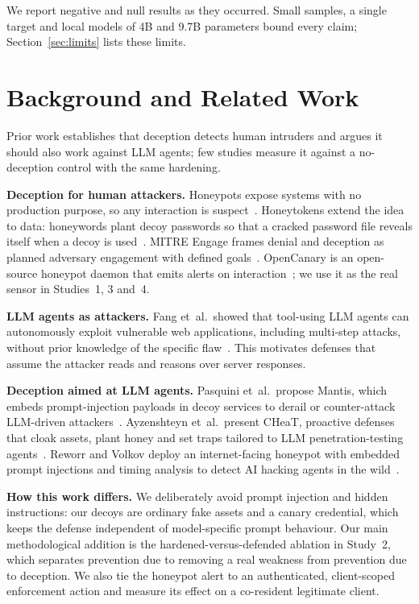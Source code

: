 \documentclass[conference]{IEEEtran}
\begin{document}
We report negative and null results as they occurred. Small samples, a single target and local models of 4B and 9.7B parameters bound every claim; Section~\ref{sec:limits} lists these limits.

\section{Background and Related Work}
Prior work establishes that deception detects human intruders and argues it should also work against LLM agents; few studies measure it against a no-deception control with the same hardening.

\textbf{Deception for human attackers.} Honeypots expose systems with no production purpose, so any interaction is suspect~\cite{spitzner2002,stoll1989}. Honeytokens extend the idea to data: honeywords plant decoy passwords so that a cracked password file reveals itself when a decoy is used~\cite{juels2013honeywords}. MITRE Engage frames denial and deception as planned adversary engagement with defined goals~\cite{mitre-engage}. OpenCanary is an open-source honeypot daemon that emits alerts on interaction~\cite{opencanary}; we use it as the real sensor in Studies~1, 3 and~4.

\textbf{LLM agents as attackers.} Fang et~al.\ showed that tool-using LLM agents can autonomously exploit vulnerable web applications, including multi-step attacks, without prior knowledge of the specific flaw~\cite{fang2024hack}. This motivates defenses that assume the attacker reads and reasons over server responses.

\textbf{Deception aimed at LLM agents.} Pasquini et~al.\ propose Mantis, which embeds prompt-injection payloads in decoy services to derail or counter-attack LLM-driven attackers~\cite{pasquini2024mantis}. Ayzenshteyn et~al.\ present CHeaT, proactive defenses that cloak assets, plant honey and set traps tailored to LLM penetration-testing agents~\cite{ayzenshteyn2025cheat}. Reworr and Volkov deploy an internet-facing honeypot with embedded prompt injections and timing analysis to detect AI hacking agents in the wild~\cite{reworr2024honeypot}.

\textbf{How this work differs.} We deliberately avoid prompt injection and hidden instructions: our decoys are ordinary fake assets and a canary credential, which keeps the defense independent of model-specific prompt behaviour. Our main methodological addition is the hardened-versus-defended ablation in Study~2, which separates prevention due to removing a real weakness from prevention due to deception. We also tie the honeypot alert to an authenticated, client-scoped enforcement action and measure its effect on a co-resident legitimate client.
\end{document}
